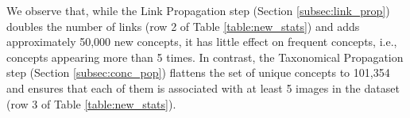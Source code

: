 \documentclass[11pt]{article}
\begin{document}
We observe that,  while the Link Propagation step (Section \ref{subsec:link_prop}) doubles the number of links (row 2 of Table \ref{table:new_stats}) and adds approximately 50,000 new concepts, it has little effect on frequent concepts, i.e., concepts appearing more than 5 times.
In contrast, the Taxonomical Propagation step (Section \ref{subsec:conc_pop}) flattens the set of unique concepts to 101,354 and ensures that each of them is associated with at least 5 images in the dataset (row 3 of Table \ref{table:new_stats}).
\end{document}

